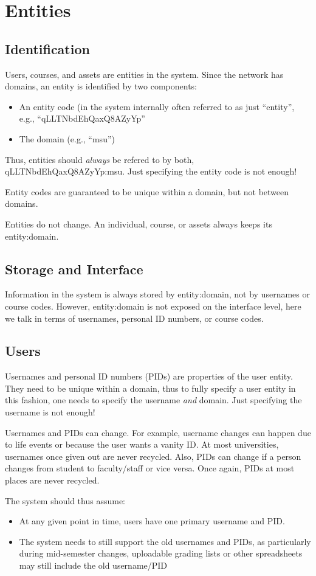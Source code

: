 \chapter{Entities}
\section{Identification}\label{entities}
Users, courses, and assets are entities in the system. Since the network has domains, an entity is identified by two components:
\begin{itemize}
\item An entity code (in the system internally often referred to as just ``entity'', e.g., ``qLLTNbdEhQaxQ8AZyYp''
\item The domain (e.g., ``msu'')
\end{itemize}
Thus, entities should {\it always} be refered to by both, qLLTNbdEhQaxQ8AZyYp:msu. Just specifying the entity code is not enough!

Entity codes are guaranteed to be unique within a domain, but not between domains.

Entities do not change. An individual, course, or assets always keeps its entity:domain.
\section{Storage and Interface}
Information in the system is always stored by entity:domain, not by usernames or course codes. However, entity:domain is not exposed on the interface level, here we talk in terms of usernames, personal ID numbers, or course codes.
\section{Users}
Usernames and personal ID numbers (PIDs) are properties of the user entity. They need to be unique within a domain, thus to fully specify a user entity in this fashion, one needs to specify the username {\it and} domain. Just specifying the username is not enough!

Usernames and PIDs can change. For example, username changes can happen due to life events or because the user wants a vanity ID. At most universities, usernames once given out are never recycled. Also, PIDs can change if a person changes from student to faculty/staff or vice versa. Once again, PIDs at most places are never recycled.

The system should thus assume:
\begin{itemize}
\item At any given point in time, users have one primary username and PID.
\item The system needs to still support the old usernames and PIDs, as particularly during mid-semester changes, uploadable grading lists or other spreadsheets may still include the old username/PID
\end{itemize}

